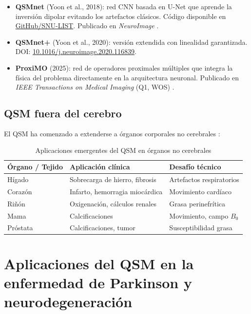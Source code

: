 \documentclass[12pt, a4paper]{article}
\begin{document}
\begin{itemize}[leftmargin=2em]
  \item \textbf{QSMnet} (Yoon et al., 2018): red CNN basada en U-Net que aprende la inversión dipolar evitando los artefactos clásicos. Código disponible en \href{https://github.com/SNU-LIST/QSMnet}{GitHub/SNU-LIST}. Publicado en \emph{NeuroImage} \cite{Yoon2018QSMnet}.
  \item \textbf{QSMnet+} (Yoon et al., 2020): versión extendida con linealidad garantizada. DOI: \href{https://doi.org/10.1016/j.neuroimage.2020.116839}{10.1016/j.neuroimage.2020.116839}.
  \item \textbf{ProxiMO} (2025): red de operadores proximales múltiples que integra la física del problema directamente en la arquitectura neuronal. Publicado en \emph{IEEE Transactions on Medical Imaging} (Q1, WOS) \cite{Cai2021ProxiMO}.
\end{itemize}

\subsection{QSM fuera del cerebro}

El QSM ha comenzado a extenderse a órganos corporales no cerebrales \cite{QSMbody2023}:

\begin{table}[h!]
  \centering
  \caption{Aplicaciones emergentes del QSM en órganos no cerebrales}
  \begin{tabular}{lll}
    \toprule
    \textbf{Órgano / Tejido} & \textbf{Aplicación clínica} & \textbf{Desafío técnico} \\
    \midrule
    Hígado   & Sobrecarga de hierro, fibrosis       & Artefactos respiratorios \\
    Corazón  & Infarto, hemorragia miocárdica        & Movimiento cardíaco \\
    Riñón    & Oxigenación, cálculos renales         & Grasa perinefrítica \\
    Mama     & Calcificaciones                       & Movimiento, campo $B_0$ \\
    Próstata & Calcificaciones, tumor                & Susceptibilidad grasa \\
    \bottomrule
  \end{tabular}
\end{table}

\section{Aplicaciones del QSM en la enfermedad de Parkinson y neurodegeneración}
\end{document}
